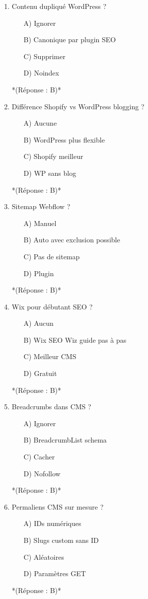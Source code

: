 \documentclass[12pt,a4paper,twoside]{report}
\begin{document}
\begin{enumerate}
\item Contenu dupliqué WordPress ?
\begin{itemize}
\item[A)] Ignorer
\item[B)] Canonique par plugin SEO
\item[C)] Supprimer
\item[D)] Noindex
\end{itemize}
*(Réponse : B)*

\item Différence Shopify vs WordPress blogging ?
\begin{itemize}
\item[A)] Aucune
\item[B)] WordPress plus flexible
\item[C)] Shopify meilleur
\item[D)] WP sans blog
\end{itemize}
*(Réponse : B)*

\item Sitemap Webflow ?
\begin{itemize}
\item[A)] Manuel
\item[B)] Auto avec exclusion possible
\item[C)] Pas de sitemap
\item[D)] Plugin
\end{itemize}
*(Réponse : B)*

\item Wix pour débutant SEO ?
\begin{itemize}
\item[A)] Aucun
\item[B)] Wix SEO Wiz guide pas à pas
\item[C)] Meilleur CMS
\item[D)] Gratuit
\end{itemize}
*(Réponse : B)*

\item Breadcrumbs dans CMS ?
\begin{itemize}
\item[A)] Ignorer
\item[B)] BreadcrumbList schema
\item[C)] Cacher
\item[D)] Nofollow
\end{itemize}
*(Réponse : B)*

\item Permaliens CMS sur mesure ?
\begin{itemize}
\item[A)] IDs numériques
\item[B)] Slugs custom sans ID
\item[C)] Aléatoires
\item[D)] Paramètres GET
\end{itemize}
*(Réponse : B)*


\end{enumerate}
\end{document}
